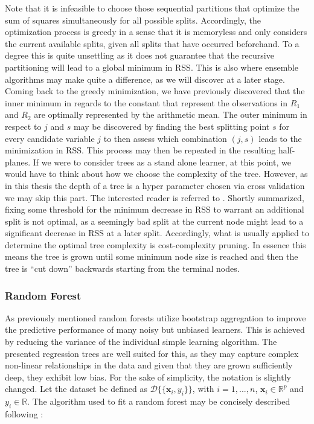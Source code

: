 \documentclass[a4paper,12pt, headsepline]{scrartcl}
\numberwithin{equation}{section}
\begin{document}
Note that it is infeasible to choose those sequential partitions that optimize the sum of squares simultaneously for all possible splits. Accordingly, the optimization process is greedy in a sense that it is memoryless and only considers the current available splits, given all splits that have occurred beforehand. To a degree this is quite unsettling as it does not guarantee that the recursive partitioning will lead to a global minimum in RSS. This is also where ensemble algorithms may make quite a difference, as we will discover at a later stage. Coming back to the greedy minimization, we have previously discovered that the inner minimum in regards to the constant that represent the observations in $R_1$ and $R_2$ are optimally represented by the arithmetic mean. The outer minimum in respect to $j$ and $s$ may be discovered by  finding the best splitting point $s$ for every candidate variable $j$ to then assess which combination $(j, s)$ leads to the minimization in RSS. This process may then be repeated in the resulting half-planes. If we were to consider trees as a stand alone learner, at this point, we would have to think about how we choose the complexity of the tree. However, as in this thesis the depth of a tree is a hyper parameter chosen via cross validation we may skip this part. The interested reader is referred to \citet{hastie09}. Shortly summarized, fixing some threshold for the minimum decrease in RSS to warrant an additional split is not optimal, as a seemingly bad split at the current node  might lead to a significant decrease in RSS at a later split. Accordingly, what is usually applied to determine the optimal tree complexity is cost-complexity pruning. In essence this means the tree is grown until some minimum node size is reached and then the tree is \enquote{cut down} backwards starting from the terminal nodes.

\subsubsection{Random Forest}\label{subsubsec:rf}
As previously mentioned random forests utilize bootstrap aggregation to improve the predictive performance of many noisy but unbiased learners. This is achieved by reducing the variance of the individual simple learning algorithm. The presented regression trees are well suited for this, as they may capture complex non-linear relationships in the data and given that they are grown sufficiently deep, they exhibit low bias. For the sake of simplicity, the notation is slightly changed. Let the dataset be defined as $\mathcal{D}\{\{\bm x_i, y_i\}\}$, with $i = 1, ..., n$, $\bm x_i \in \mathbb{R}^p$ and $y_i \in \mathbb{R}$. The algorithm used to fit a random forest may be concisely described following \citet{hastie09}:
\end{document}
